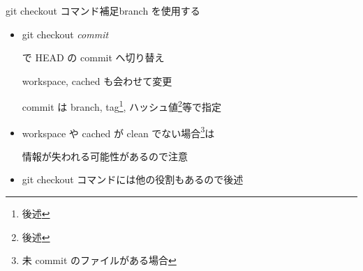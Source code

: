 \begin{frame}[t]{git checkout コマンド補足}{branch を使用する}

  \begin{itemize}
  \item git checkout \textit{commit}

    で HEAD の commit へ切り替え

    workspace, cached も会わせて変更

    commit は branch, tag\footnote{後述}, ハッシュ値\footnote{後述}等で指定
    \vspace{2ex}

  \item workspace や cached が clean でない場合\footnote{未 commit のファイルがある場合}は

    情報が失われる可能性があるので注意
    \vspace{2ex}

  \item git checkout コマンドには他の役割もあるので後述
  \end{itemize}

\end{frame}
